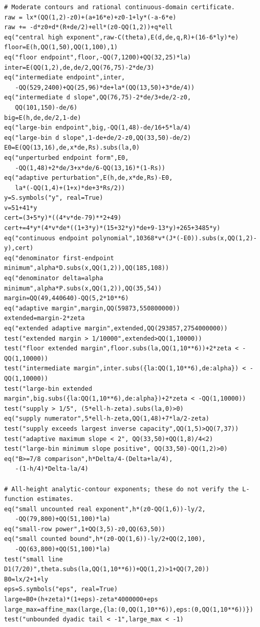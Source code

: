 \documentclass[12pt]{article}
\begin{document}
\begin{verbatim}
# Moderate contours and rational continuous-domain certificate.
raw = lx*(QQ(1,2)-z0)+(a+16*e)+z0-1+ly*(-a-6*e)
raw += -d*z0+d*(R+de/2)+ell*(z0-QQ(1,2))+q*ell
eq("central high exponent",raw-C(theta),E(d,de,q,R)+(16-6*ly)*e)
floor=E(h,QQ(1,50),QQ(1,100),1)
eq("floor endpoint",floor,-QQ(7,1200)+QQ(32,25)*la)
inter=E(QQ(1,2),de,de/2,QQ(76,75)-2*de/3)
eq("intermediate endpoint",inter,
   -QQ(529,2400)+QQ(25,96)*de+la*(QQ(13,50)+3*de/4))
eq("intermediate d slope",QQ(76,75)-2*de/3+de/2-z0,
   QQ(101,150)-de/6)
big=E(h,de,de/2,1-de)
eq("large-bin endpoint",big,-QQ(1,48)-de/16+5*la/4)
eq("large-bin d slope",1-de+de/2-z0,QQ(33,50)-de/2)
E0=E(QQ(13,16),de,x*de,Rs).subs(la,0)
eq("unperturbed endpoint form",E0,
   -QQ(1,48)+2*de/3+x*de/6-QQ(13,16)*(1-Rs))
eq("adaptive perturbation",E(h,de,x*de,Rs)-E0,
   la*(-QQ(1,4)+(1+x)*de+3*Rs/2))
y=S.symbols("y", real=True)
v=51+41*y
cert=(3+5*y)*((4*v*de-79)**2+49)
cert+=4*y*(4*v*de*((1+3*y)*(15+32*y)*de+9-13*y)+265+3485*y)
eq("continuous endpoint polynomial",10368*v*(J*(-E0)).subs(x,QQ(1,2)-y),cert)
eq("denominator first-endpoint minimum",alpha*D.subs(x,QQ(1,2)),QQ(185,108))
eq("denominator delta=alpha minimum",alpha*P.subs(x,QQ(1,2)),QQ(35,54))
margin=QQ(49,440640)-QQ(5,2*10**6)
eq("adaptive margin",margin,QQ(59873,550800000))
extended=margin-2*zeta
eq("extended adaptive margin",extended,QQ(293857,2754000000))
test("extended margin > 1/10000",extended>QQ(1,10000))
test("floor extended margin",floor.subs(la,QQ(1,10**6))+2*zeta < -QQ(1,10000))
test("intermediate margin",inter.subs({la:QQ(1,10**6),de:alpha}) < -QQ(1,10000))
test("large-bin extended margin",big.subs({la:QQ(1,10**6),de:alpha})+2*zeta < -QQ(1,10000))
test("supply > 1/5", (5*ell-h-zeta).subs(la,0)>0)
eq("supply numerator",5*ell-h-zeta,QQ(1,48)+7*la/2-zeta)
test("supply exceeds largest inverse capacity",QQ(1,5)>QQ(7,37))
test("adaptive maximum slope < 2", QQ(33,50)+QQ(1,8)/4<2)
test("large-bin minimum slope positive", QQ(33,50)-QQ(1,2)>0)
eq("B>=7/8 comparison",h*Delta/4-(Delta+la/4),
   -(1-h/4)*Delta-la/4)

# All-height analytic-contour exponents; these do not verify the L-function estimates.
eq("small uncounted real exponent",h*(z0-QQ(1,6))-ly/2,
   -QQ(79,800)+QQ(51,100)*la)
eq("small-row power",1+QQ(3,5)-z0,QQ(63,50))
eq("small counted bound",h*(z0-QQ(1,6))-ly/2+QQ(2,100),
   -QQ(63,800)+QQ(51,100)*la)
test("small line D1(7/20)",theta.subs(la,QQ(1,10**6))+QQ(1,2)>1+QQ(7,20))
B0=lx/2+1+ly
eps=S.symbols("eps", real=True)
large=B0+(h+zeta)*(1+eps)-zeta*4000000+eps
large_max=affine_max(large,{la:(0,QQ(1,10**6)),eps:(0,QQ(1,10**6))})
test("unbounded dyadic tail < -1",large_max < -1)


\end{verbatim}
\end{document}
